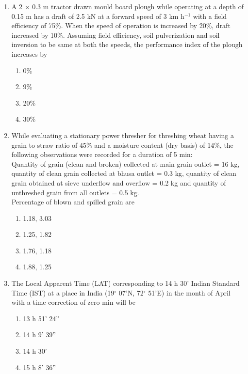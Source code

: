 \documentclass[journal]{IEEEtran}
\numberwithin{equation}{enumi}
\numberwithin{figure}{enumi}
\begin{document}
\begin{enumerate}
    
\item A 2 $\times$ 0.3 m tractor drawn mould board plough while operating at a depth of 0.15 m has a draft of 2.5 kN at a forward speed of 3 km h$^{-1}$ with a field efficiency of 75\%. When the speed of operation is increased by 20\%, draft increased by 10\%. Assuming field efficiency, soil pulverization and soil inversion to be same at both the speeds, the performance index of the plough increases by 
\hfill{}
\begin{multicols}{4}
    \begin{enumerate}
    \item  0\%
    \item  9\%
    \item 20\%
    \item 30\%
    \end{enumerate}
    \end{multicols}



    
\item While evaluating a stationary power thresher for threshing wheat having a grain to straw ratio of 45\% and a moisture content (dry basis) of 14\%, the following observations were recorded for a duration of 5 min: \\
Quantity of grain (clean and broken) collected at main grain outlet = 16 kg, quantity of clean grain collected at bhusa outlet = 0.3 kg, quantity of clean grain obtained at sieve underflow and overflow = 0.2 kg and quantity of unthreshed grain from all outlets = 0.5 kg. \\
Percentage of blown and spilled grain are 
\hfill{}
\begin{multicols}{4}
    \begin{enumerate}
    \item  1.18, 3.03
    \item  1.25, 1.82
    \item  1.76, 1.18
    \item  1.88, 1.25 
    \end{enumerate}
    \end{multicols}





\item The Local Apparent Time (LAT) corresponding to 14 h 30' Indian Standard Time (IST) at a place in India (19$^\circ$ 07'N, 72$^\circ$ 51'E) in the month of April with a time correction of zero min will be
\hfill{}
\begin{multicols}{2}
    \begin{enumerate}
    \item  13 h 51' 24''
    \item  14 h 9' 39''
    \item  14 h 30'
    \item  15 h 8' 36''
    \end{enumerate}
    \end{multicols}





\end{enumerate}
\end{document}
